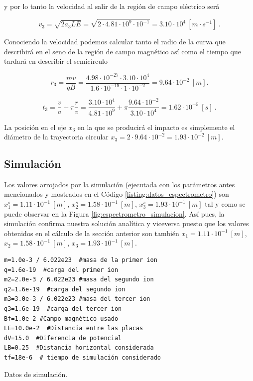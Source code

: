 \documentclass[journal]{IEEEtran}
\newenvironment{code}{\captionsetup{type=listing}}{\par\addvspace{\baselineskip}}
\begin{document}
y por lo tanto la velocidad al salir de la región de campo eléctrico será

\begin{equation}
v_3 = \sqrt{2a_3LE} = \sqrt{2\cdot 4.81 \cdot 10^{9} \cdot 10^{-1}} = 3.10 \cdot 10^4~[m\cdot s^{-1}]~.
\end{equation}

Conociendo la velocidad podemos calcular tanto el radio de la curva que describirá en el seno de la región de campo magnético así como el tiempo que tardará en describir el semicírculo

\begin{equation}
r_3 = \displaystyle\frac{mv}{qB} = \displaystyle\frac{4.98\cdot 10^{-27} \cdot 3.10\cdot 10^4}{1.6\cdot 10^{-19}\cdot 1 \cdot 10^{-2}} = 9.64\cdot 10^{-2}~[m].
\end{equation}

\begin{equation}
t_3 = \displaystyle\frac{v}{a} + \pi \displaystyle\frac{r}{v} = \displaystyle\frac{3.10 \cdot 10^4}{4.81 \cdot 10^{9}} + \pi \displaystyle\frac{9.64 \cdot 10^{-2}}{3.10 \cdot 10^4} = 1.62 \cdot 10^{-5}~[s]~.
\end{equation}

La posición en el eje $x_3$ en la que se producirá el impacto es simplemente el diámetro de la trayectoria circular $x_3 = 2\cdot9.64 \cdot 10^{-2} = 1.93 \cdot 10^{-2}~[m]$.

\subsection{Simulación}

Los valores arrojados por la simulación (ejecutada con los parámetros antes mencionados y mostrados en el Código \ref{listing:datos_espectrometro}) son $x^s_1 = 1.11\cdot 10^{-1}~[m]$, $x^s_2 = 1.58\cdot 10^{-1}~[m]$, $x^s_3 = 1.93\cdot 10^{-1}~[m]$ tal y como se puede observar en la Figura \ref{fig:espectrometro_simulacion}. Así pues, la simulación confirma nuestra solución analítica y viceversa puesto que los valores obtenidos en el cálculo de la sección anterior son también $x_1 = 1.11\cdot 10^{-1}~[m]$, $x_2 = 1.58\cdot 10^{-1}~[m]$, $x_3 = 1.93\cdot 10^{-1}~[m]$.

\bigskip

\begin{code}
    \begin{verbatim}
m=1.0e-3 / 6.022e23  #masa de la primer ion
q=1.6e-19  #carga del primer ion
m2=2.0e-3 / 6.022e23 #masa del segundo ion
q2=1.6e-19  #carga del segundo ion
m3=3.0e-3 / 6.022e23 #masa del tercer ion
q3=1.6e-19  #carga del tercer ion
Bf=1.0e-2 #Campo magnético usado
LE=10.0e-2  #Distancia entre las placas
dV=15.0  #Diferencia de potencial
LB=0.25  #Distancia horizontal considerada
tf=18e-6  # tiempo de simulación considerado 
    \end{verbatim}
    \caption{Datos de simulación.}
    \label{listing:datos_espectrometro}
\end{code}
\end{document}
